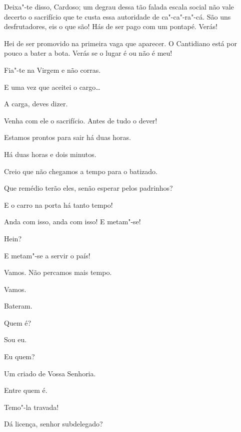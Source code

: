  Deixa"-te disso, Cardoso; um degrau dessa tão falada escala social
não vale decerto o sacrifício que te custa essa autoridade de ca"-ca"-ra"-cá. São
uns desfrutadores, eis o que são! Hás de ser pago com um pontapé. Verás!

 Hei de ser promovido na primeira vaga que aparecer. O
Cantidiano está por pouco a bater a bota. Verás se o lugar é ou não é meu!

 Fia"-te na Virgem e não corras.

 E uma vez que aceitei o cargo\ldots

 A carga, deves dizer.

 Venha com ele o sacrifício. Antes de tudo o dever!

 Estamos prontos para sair há duas horas.

  Há duas horas e
dois minutos.

  Creio que não chegamos a
tempo para o batizado.

 Que remédio terão eles, senão esperar pelos padrinhos?

 E o carro na porta há tanto tempo!

 Anda com isso, anda com isso! E metam"-se!

 Hein?

 E metam"-se a servir o país!

 Vamos. Não percamos mais tempo.

 Vamos. 

 Bateram.

 Quem é?

  Sou eu.

 Eu quem?

  Um criado de Vossa Senhoria.

 Entre quem é.

 Temo"-la travada! 

{}


  Dá licença, senhor
subdelegado?


